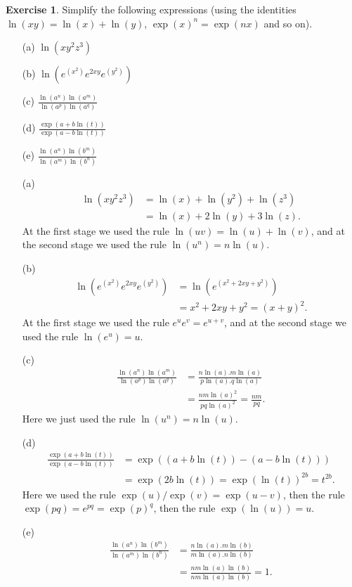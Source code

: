 \documentclass[a4paper]{amsart}
\theoremstyle{definition}
\newtheorem{exercise}{Exercise}[section]
\newenvironment{solution}{{\noindent \bf Solution:}}{}
\begin{document}
\begin{exercise}\label{ex-log-exp}
Simplify the following expressions (using the identities
 $\ln(xy)=\ln(x)+\ln(y)$, $\exp(x)^n=\exp(nx)$ and so on).
 \begin{itemize}
  \item[(a)] $\ln(xy^2z^3)$
  \item[(b)] $\ln(e^{(x^2)} e^{2xy} e^{(y^2)})$
  \item[(c)] $\displaystyle\frac{\ln(a^n)\ln(a^m)}{\ln(a^p)\ln(a^q)}$
  \item[(d)] $\displaystyle\frac{\exp(a+b\ln(t))}{\exp(a-b\ln(t))}$
  \item[(e)] $\displaystyle\frac{\ln(a^n)\ln(b^m)}{\ln(a^m)\ln(b^n)}$
 \end{itemize}
\end{exercise}
\begin{solution}
\begin{itemize}
  \item[(a)]
   \begin{align*}
    \ln(xy^2z^3) &= \ln(x) + \ln(y^2) + \ln(z^3) \\
                  &= \ln(x) + 2\ln(y) + 3\ln(z).
   \end{align*}
   At the first stage we used the rule $\ln(uv)=\ln(u)+\ln(v)$, and
   at the second stage we used the rule $\ln(u^n)=n\ln(u)$.
  \item[(b)]
   \begin{align*}
    \ln(e^{(x^2)} e^{2xy} e^{(y^2)})
     &= \ln(e^{(x^2+2xy+y^2)}) \\
     &= x^2+2xy+y^2 = (x+y)^2.
   \end{align*}
   At the first stage we used the rule $e^ue^v=e^{u+v}$, and at the
   second stage we used the rule $\ln(e^u)=u$.
  \item[(c)]
   \begin{align*}
    \frac{\ln(a^n)\ln(a^m)}{\ln(a^p)\ln(a^q)}
     &= \frac{n\ln(a).m\ln(a)}{p\ln(a).q\ln(a)} \\
     &= \frac{nm\ln(a)^2}{pq\ln(a)^2} = \frac{nm}{pq}.
   \end{align*}
   Here we just used the rule $\ln(u^n)=n\ln(u)$.
  \item[(d)]
   \begin{align*}
    \frac{\exp(a+b\ln(t))}{\exp(a-b\ln(t))}
     &= \exp((a+b\ln(t))-(a-b\ln(t))) \\
     &= \exp(2b\ln(t)) = \exp(\ln(t))^{2b} = t^{2b}.
   \end{align*}
   Here we used the rule $\exp(u)/\exp(v)=\exp(u-v)$, then the rule
   $\exp(pq)=e^{pq}=\exp(p)^q$, then the rule $\exp(\ln(u))=u$.
  \item[(e)]
   \begin{align*}
    \frac{\ln(a^n)\ln(b^m)}{\ln(a^m)\ln(b^n)}
     &= \frac{n\ln(a).m\ln(b)}{m\ln(a).n\ln(b)} \\
     &= \frac{nm\ln(a)\ln(b)}{nm\ln(a)\ln(b)} = 1.
   \end{align*}
 \end{itemize}
\end{solution}
\end{document}
